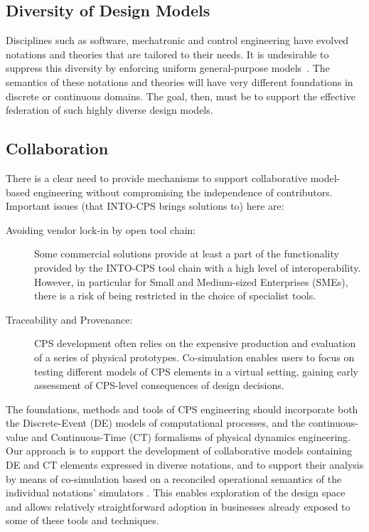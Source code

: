 \subsection{Diversity of Design Models}

Disciplines such as software, mechatronic and control engineering have evolved notations and theories that are tailored to their needs. It is undesirable to suppress this diversity by enforcing uniform general-purpose models~\cite{Fitzgerald&15,Larsen&16e}. The semantics of these notations and theories will have very different foundations in discrete or continuous domains. The goal, then, must be to support the effective federation of such highly diverse design models.

\subsection{Collaboration}

There is a clear need to provide mechanisms to support collaborative model-based engineering without compromising the independence of contributors. Important issues (that INTO-CPS brings solutions to) here are:
\begin{description}
\item[Avoiding vendor lock-in by open tool chain:] Some commercial solutions provide at least a part of the functionality provided by the INTO-CPS tool chain with a high level of interoperability. However, in particular for Small and Medium-sized Enterprises (SMEs), there is a risk of being restricted in the choice of specialist tools.
\item[Traceability and Provenance:] CPS development often relies on the expensive production and evaluation of a series of physical prototypes. Co-simulation enables users to focus on testing different models of CPS elements in a virtual setting, gaining early assessment of CPS-level consequences of design decisions.
\end{description}

The foundations, methods and tools of CPS engineering should incorporate both the Discrete-Event (DE) models of computational processes, and the continuous-value and Continuous-Time (CT) formalisms of physical dynamics engineering. Our approach is to support the development of collaborative models containing DE and CT elements expressed in diverse notations, and to support their analysis by means of co-simulation based on a reconciled operational semantics of the individual notations' simulators \cite{Fitzgerald&14c}. This enables exploration of the design space and allows relatively straightforward adoption in businesses already exposed to some of these tools and techniques. 

